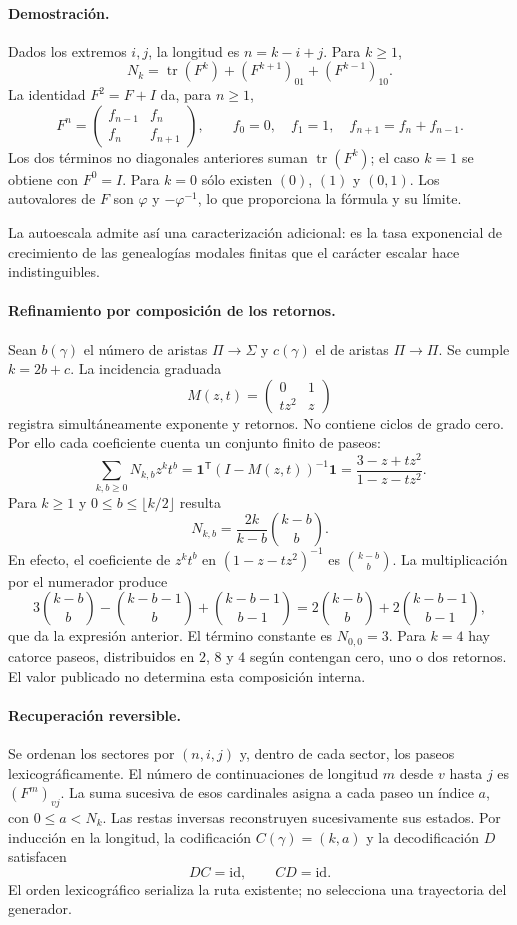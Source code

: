 \paragraph{Demostración.}
Dados los extremos $i,j$, la longitud es $n=k-i+j$. Para $k\ge1$,
\[
 N_k=\operatorname{tr}(F^k)+(F^{k+1})_{01}+(F^{k-1})_{10}.
\]
La identidad $F^2=F+I$ da, para $n\ge1$,
\[
 F^n=\begin{pmatrix}f_{n-1}&f_n\\f_n&f_{n+1}\end{pmatrix},
 \qquad f_0=0,\quad f_1=1,\quad f_{n+1}=f_n+f_{n-1}.
\]
Los dos términos no diagonales anteriores suman
$\operatorname{tr}(F^k)$; el caso $k=1$ se obtiene con $F^0=I$.
Para $k=0$ sólo existen $(0)$, $(1)$ y $(0,1)$.
Los autovalores de $F$ son $\varphi$ y $-\varphi^{-1}$, lo que proporciona
la fórmula y su límite.

La autoescala admite así una caracterización adicional: es la tasa
exponencial de crecimiento de las genealogías modales finitas que
el carácter escalar hace indistinguibles.

\paragraph{Refinamiento por composición de los retornos.}
Sean $b(\gamma)$ el número de aristas $\Pi\to\Sigma$ y $c(\gamma)$ el de
aristas $\Pi\to\Pi$. Se cumple $k=2b+c$. La incidencia graduada
\[
 M(z,t)=\begin{pmatrix}0&1\\tz^2&z\end{pmatrix}
\]
registra simultáneamente exponente y retornos. No contiene ciclos de
grado cero. Por ello cada coeficiente cuenta un conjunto finito de paseos:
\[
 \sum_{k,b\ge0}N_{k,b}z^kt^b
 =\mathbf1^{\mathsf T}(I-M(z,t))^{-1}\mathbf1
 =\frac{3-z+tz^2}{1-z-tz^2}.
\]
Para $k\ge1$ y $0\le b\le\lfloor k/2\rfloor$ resulta
\[
 N_{k,b}=\frac{2k}{k-b}\binom{k-b}{b}.
\]
En efecto, el coeficiente de $z^kt^b$ en
$(1-z-tz^2)^{-1}$ es $\binom{k-b}{b}$. La multiplicación por el numerador
produce
\[
 3\binom{k-b}{b}-\binom{k-b-1}{b}+\binom{k-b-1}{b-1}
 =2\binom{k-b}{b}+2\binom{k-b-1}{b-1},
\]
que da la expresión anterior. El término constante es $N_{0,0}=3$.
Para $k=4$ hay catorce paseos, distribuidos en $2$, $8$ y $4$ según
contengan cero, uno o dos retornos. El valor publicado no determina
esta composición interna.

\paragraph{Recuperación reversible.}
Se ordenan los sectores por $(n,i,j)$ y, dentro de cada sector, los paseos
lexicográficamente. El número de continuaciones de longitud $m$ desde
$v$ hasta $j$ es $(F^m)_{vj}$. La suma sucesiva de esos cardinales asigna
a cada paseo un índice $a$, con $0\le a<N_k$. Las restas inversas
reconstruyen sucesivamente sus estados. Por inducción en la longitud,
la codificación $C(\gamma)=(k,a)$ y la decodificación $D$ satisfacen
\[
 D C=\mathrm{id},\qquad C D=\mathrm{id}.
\]
El orden lexicográfico serializa la ruta existente; no selecciona una
trayectoria del generador.

